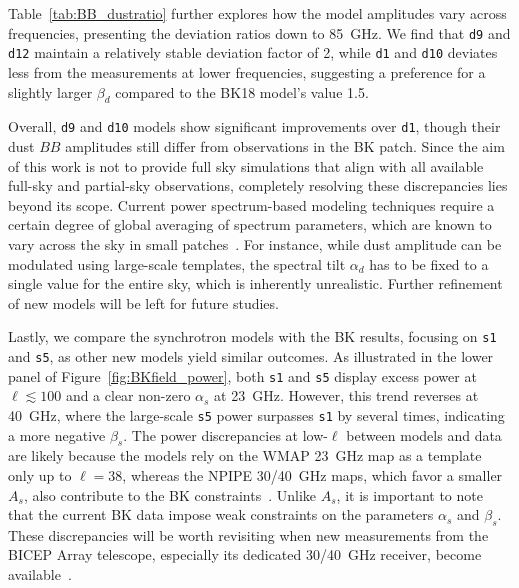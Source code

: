 \documentclass[twocolumn]{aastex631}
\begin{document}
Table~\ref{tab:BB_dustratio} further explores how the model amplitudes vary across frequencies, presenting the deviation ratios down to 85~GHz. We find that \texttt{d9} and \texttt{d12} maintain a relatively stable deviation factor of 2, while \texttt{d1} and \texttt{d10} deviates less from the measurements at lower frequencies, suggesting a preference for a slightly larger $\beta_d$ compared to the BK18 model's value 1.5. 

Overall, \texttt{d9} and \texttt{d10} models show significant improvements over \texttt{d1}, though their dust $BB$ amplitudes still differ from observations in the BK patch. Since the aim of this work is not to provide full sky simulations that align with all available full-sky and partial-sky observations, completely resolving these discrepancies lies beyond its scope. Current power spectrum-based modeling techniques require a certain degree of global averaging of spectrum parameters, which are known to vary across the sky in small patches~\citep{planck2016-l04}. For instance, while dust amplitude can be modulated using large-scale templates, the spectral tilt $\alpha_d$ has to be fixed to a single value for the entire sky, which is inherently unrealistic. Further refinement of new models will be left for future studies. 

Lastly, we compare the synchrotron models with the BK results, focusing on \texttt{s1} and \texttt{s5}, as other new models yield similar outcomes. As illustrated in the lower panel of Figure~\ref{fig:BKfield_power}, both \texttt{s1} and \texttt{s5} display excess power at $\ell \lesssim 100$ and a clear non-zero $\alpha_s$ at 23~GHz. However, this trend reverses at 40~GHz, where the large-scale \texttt{s5} power surpasses \texttt{s1} by several times, indicating a more negative $\beta_s$. The power discrepancies at low-$\ell$ between models and data are likely because the models rely on the WMAP 23~GHz map as a template only up to $\ell = 38$, whereas the NPIPE 30/40~GHz maps, which favor a smaller $A_s$, also contribute to the BK constraints~\citep[][Figure~21]{Ade:2021}. Unlike $A_s$, it is important to note that the current BK data impose weak constraints on the parameters $\alpha_s$ and $\beta_s$. These discrepancies will be worth revisiting when new measurements from the BICEP Array telescope, especially its dedicated 30/40~GHz receiver, become available~\citep{Moncelsi:2020}.
\end{document}
